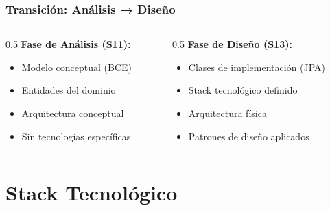 \documentclass[aspectratio=169]{beamer}
\begin{document}
\begin{frame}
\frametitle{Transición: Análisis → Diseño}

\begin{columns}
\begin{column}{0.5\textwidth}
\textbf{Fase de Análisis (S11):}
\begin{itemize}
\item Modelo conceptual (BCE)
\item Entidades del dominio
\item Arquitectura conceptual
\item Sin tecnologías específicas
\end{itemize}
\end{column}

\begin{column}{0.5\textwidth}
\textbf{Fase de Diseño (S13):}
\begin{itemize}
\item Clases de implementación (JPA)
\item Stack tecnológico definido
\item Arquitectura física
\item Patrones de diseño aplicados
\end{itemize}
\end{column}
\end{columns}

\vspace{0.5cm}

\begin{center}
\end{center}

\end{frame}

\section{Stack Tecnológico}
\end{document}
